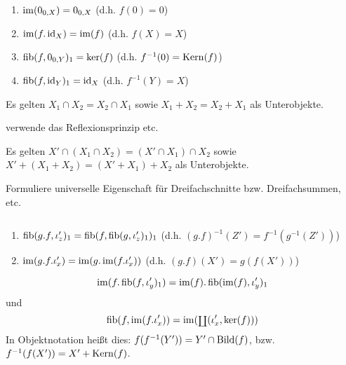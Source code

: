\begin{lemm}[Regel (a)] $\quad$ %
\begin{enumerate}
\item $\operatorname{im}(0_{0,X}) = 0_{0,X}$ (d.h. $f(0) = 0$)
\item $\operatorname{im}(f.\operatorname{id}_X) = \operatorname{im}(f)$ (d.h. $f(X) = X$)
\item $\operatorname{fib}(f,0_{0,Y})_1 = \ker(f)$ (d.h. $f^{-1}(0) = \operatorname{Kern}(f)$)
\item $\operatorname{fib}(f,\operatorname{id}_Y)_1 = \operatorname{id}_X$ (d.h. $f^{-1}(Y) = X$)
\end{enumerate}
\end{lemm}

\begin{lemm}[Regel (b)]
Es gelten $X_1 \cap X_2 = X_2 \cap X_1$
sowie $X_1 + X_2 = X_2 + X_1$ als Unterobjekte.
\end{lemm}
\begin{bew}
verwende das Reflexionsprinzip etc.
\end{bew}

\begin{lemm}[Regel (c)]
Es gelten $X' \cap (X_1 \cap X_2) = (X' \cap X_1) \cap X_2$ 
sowie $X' + (X_1 + X_2) = (X' + X_1) + X_2$ als Unterobjekte.
\end{lemm}
\begin{bew}
Formuliere universelle Eigenschaft für Dreifachschnitte bzw. Dreifachsummen, etc.
\end{bew}

\begin{lemm}[Regel (d)] $\quad$ %
\begin{enumerate}
\item $\operatorname{fib}(g.f, \iota_z')_1 = \operatorname{fib}(f, \operatorname{fib}(g, \iota_z')_1)_1$ (d.h. $(g.f)^{-1}(Z') = f^{-1}(g^{-1}(Z'))$)
\item $\operatorname{im}(g.f.\iota_x') = \operatorname{im}(g.\operatorname{im}(f.\iota_x'))$ (d.h. $(g.f)(X') = g(f(X'))$)
\end{enumerate}
\end{lemm}

\begin{lemm}[Regel (e)]
\[
\operatorname{im}(f.\operatorname{fib}(f,\iota_y')_1) = \operatorname{im}(f).\operatorname{fib}(\operatorname{im}(f),\iota_y')_1
\]
und
\[
\operatorname{fib}(f,\operatorname{im}(f.\iota_x')) = \operatorname{im}(\operatorname{\scriptstyle\coprod}(\iota_x', \ker(f)))
\]
In Objektnotation heißt dies: $f(f^{-1}(Y')) = Y' \cap \operatorname{Bild}(f)$, bzw. $f^{-1}(f(X')) = X' + \operatorname{Kern}(f)$.
\end{lemm}

